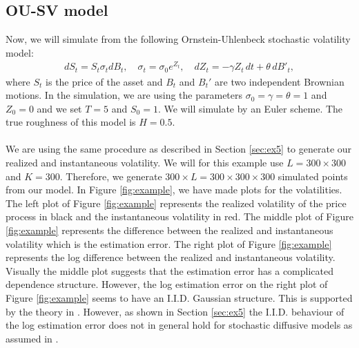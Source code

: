 \documentclass{article}
\begin{document}
\subsection{OU-SV model} \label{sec:ex6}
Now, we will simulate from the following Ornstein-Uhlenbeck stochastic volatility model:
\begin{align}
dS_t = S_t \sigma_t dB_t, \quad \sigma_t = \sigma_0 e^{Z_t}, \quad dZ_t = -\gamma Z_t \, dt + \theta \, dB'_t, \label{eq:ousv}
\end{align}
where $S_t$ is the price of the asset and $B_t$ and $B_t'$ are two independent Brownian motions. In the simulation, we are using the parameters $\sigma_0=\gamma=\theta=1$ and $Z_0=0$ and we set $T=5$ and $S_0=1$. We will simulate by an Euler scheme. The true roughness of this model is $H=0.5$.\\\\
We are using the same procedure as described in Section \ref{sec:ex5} to generate our realized and instantaneous volatility. We will for this example use $L=300\times 300$ and $K=300$. Therefore, we generate $300\times L=300\times 300 \times 300$ simulated points from our model. In Figure \ref{fig:example}, we have made plots for the volatilities. The left plot of Figure \ref{fig:example} represents the realized volatility of the price process in black and the instantaneous volatility in red. The middle plot of Figure \ref{fig:example} represents the difference between the realized and instantaneous volatility which is the estimation error. The right plot of Figure \ref{fig:example} represents the log difference between the realized and instantaneous volatility. Visually the middle plot suggests that the estimation error has a complicated dependence structure. However, the log estimation error on the right plot of Figure \ref{fig:example} seems to have an I.I.D. Gaussian structure. This is supported by the theory in \cite{fukasawa}. However, as shown in Section \ref{sec:ex5} the I.I.D. behaviour of the log estimation error does not in general hold for stochastic diffusive models as assumed in \cite{fukasawa}. 
\end{document}
